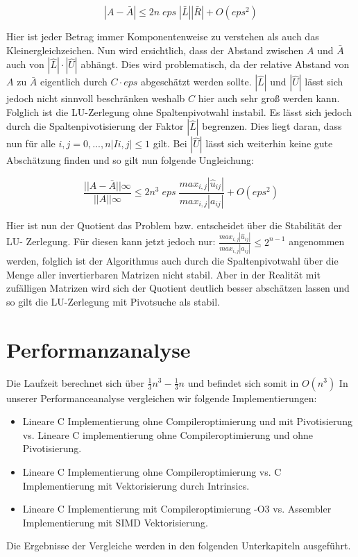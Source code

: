 \documentclass[course=erap]{aspdoc}
\begin{document}
 \begin{equation}
\label{eg3}
|A - \bar{A}| \leq 2n \; eps \; |\bar{L}||\bar{R}| + O(eps^2)
\end{equation}

Hier ist jeder Betrag immer Komponentenweise zu verstehen als auch das Kleinergleichzeichen.										%
Nun wird ersichtlich, dass der Abstand zwischen $A$ und $\bar{A}$ auch von $|\hat{L}| \cdot |\hat{U}|$
abhängt. Dies wird problematisch, da der relative Abstand von $A$ zu $\bar{A}$ eigentlich durch 
$C\cdot eps$ abgeschätzt werden sollte. $|\hat{L}|$ und $|\hat{U}|$ lässt sich jedoch nicht sinnvoll 
beschränken weshalb $C$ hier auch sehr groß werden kann.
Folglich ist die LU-Zerlegung ohne Spaltenpivotwahl instabil. Es lässt sich jedoch durch die Spaltenpivotisierung 
der Faktor $|\hat{L}|$  begrenzen. Dies liegt daran, dass nun für alle $i,j = 0,...,n |Ii,j| \leq 1$ gilt. 
Bei $|\hat{U}|$ lässt sich weiterhin keine gute Abschätzung finden und so gilt nun folgende Ungleichung:  

 \begin{equation}
\label{eg3}
\frac{||A - \bar{A}||\infty}{||A||\infty} \leq 2n^3 \; eps \;\frac{max_{i,j}| \hat{u}_{ij}|}{max_{i,j}|a_{ij}|} + O(eps^2)
\end{equation}


Hier ist nun der Quotient das Problem bzw. entscheidet über die Stabilität der LU-
Zerlegung. Für diesen kann jetzt jedoch nur: $\frac{max_{i,j}| \hat{u}_{ij}|}{max_{i,j}|a_{ij}|} \leq 2^{n-1}$ angenommen 
werden, folglich ist der Algorithmus auch durch die Spaltenpivotwahl über die Menge 
aller invertierbaren Matrizen nicht stabil. Aber in der Realität mit zufälligen Matrizen wird 
sich der Quotient deutlich besser abschätzen lassen und so gilt die LU-Zerlegung mit Pivotsuche als stabil.


\section{Performanzanalyse}
\label{Performanzanalyse}
Die Laufzeit berechnet sich über  $ \frac{1}{3}n^3 -\frac{1}{3} n $ und befindet sich somit in $O(n^3)$ \cite{LULaufzeit}
In unserer Performanceanalyse vergleichen wir folgende Implementierungen:\\
\begin{itemize}
\item Lineare C Implementierung ohne Compileroptimierung und mit Pivotisierung vs. Lineare C implementierung ohne Compileroptimierung und ohne Pivotisierung. 
\item Lineare C Implementierung ohne Compileroptimierung vs. C Implementierung mit Vektorisierung durch Intrinsics. 
\item Lineare C Implementierung mit Compileroptimierung -O3 vs. Assembler Implementierung mit SIMD Vektorisierung.
\end{itemize}
Die Ergebnisse der Vergleiche werden in den folgenden Unterkapiteln ausgeführt. \\
\end{document}
